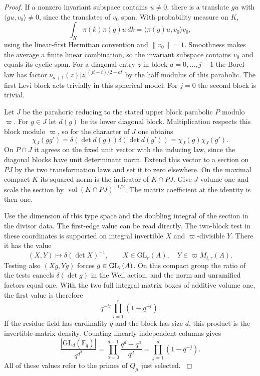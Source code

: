 \begin{proof}
If a nonzero invariant
subspace contains \(u\ne0\), there is a translate \(gu\) with
\(\langle gu,v_0\rangle\ne0\), since the translates of \(v_0\)
span. With probability measure on \(K\),
\[
  \int_K \pi(k)\pi(g)u\,dk=\langle \pi(g)u,v_0\rangle v_0 ,
\]
using the linear-first Hermitian convention and \(\|v_0\|=1\).
Smoothness makes the average a finite linear combination, so
the invariant subspace contains \(v_0\) and equals its cyclic span.
For a diagonal entry \(z\) in block \(a=0,\ldots,j-1\) the
Borel law has factor
\(\nu_{a+1}(z)|z|^{(jt-t)/2-at}\) by the half modulus of
this parabolic. The first Levi block acts trivially in this
spherical model. For \(j=0\) the second block is trivial.
\label{cor:level-four-core-4}

Let \(J\) be the parahoric reducing to the stated upper block
parabolic \(P\) modulo \(\varpi\). For \(g\in J\) let \(d(g)\) be its lower diagonal block. Multiplication respects this block modulo \(\varpi\), so for the character of \(J\) one obtains
\[
 \chi_J(gg')=\delta(\det d(g))\delta(\det d(g'))=\chi_J(g)\chi_J(g').
\]
On \(P\cap J\) it agrees on the fixed unit vector with the
inducing law, since the diagonal blocks have unit determinant
norm. Extend this vector to a section on \(PJ\) by the two
transformation laws and set it to zero elsewhere. On the
maximal compact \(K\) its squared norm is the indicator of
\(K\cap PJ\). Give \(J\) volume one and scale the section by
\(\operatorname{vol}(K\cap PJ)^{-1/2}\). The matrix coefficient
at the identity is then one.

Use the dimension of this type
space and the doubling integral of the section in the divisor
data. The first-edge value can be read directly. The two-block test in these coordinates is supported on integral invertible \(X\) and \(\varpi\)-divisible \(Y\). There it has the value
\[
 (X,Y)\longmapsto\delta(\det X)^{-1},\qquad X\in\mathrm{GL}_r(A),\quad Y\in\varpi M_{t,r}(A).
\] Testing also \((Xg,Yg)\) forces
\(g\in{\rm GL}_r(A)\). On this compact group the ratio of the
tests cancels \(\delta(\det g)\) in the Weil action, and the
norm and unramified factors equal one. With the two full
integral matrix boxes of additive volume one, the first
value is therefore
\[
                q^{-tr}\prod_{i=1}^{r}(1-q^{-i}).
\]
If the residue field has cardinality \(q\) and the block has size \(d\), this product is the invertible-matrix density. Counting linearly independent columns gives
\[
 \frac{|\mathrm{GL}_d(\mathbb F_q)|}{q^{d^2}}=\prod_{a=0}^{d-1}\frac{q^d-q^a}{q^d}=\prod_{j=1}^d(1-q^{-j}).
\] All of these values refer to the primes of
\(Q_\mu\) just selected. \label{cor:level-four-core-5}


\end{proof}
